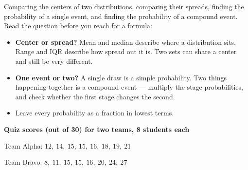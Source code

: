 \documentclass[12pt]{article}
\begin{document}

\noindent\small
Comparing the centers of two distributions, comparing their spreads, finding
the probability of a single event, and finding the probability of a compound
event. Read the question before you reach for a formula:
\begin{itemize}[leftmargin=1.1cm, itemsep=1pt, topsep=2pt]
  \item \textbf{Center or spread?} Mean and median describe where a
        distribution sits. Range and IQR describe how spread out it is. Two
        sets can share a center and still be very different.
  \item \textbf{One event or two?} A single draw is a simple probability. Two
        things happening together is a compound event --- multiply the stage
        probabilities, and check whether the first stage changes the second.
  \item Leave every probability as a fraction in lowest terms.
\end{itemize}
\normalsize

\vspace{0.15cm}

\noindent\textbf{Quiz scores (out of 30) for two teams, 8 students each}
\par\smallskip
\noindent\hspace*{0.4cm}Team Alpha: \quad $12,\ 14,\ 15,\ 15,\ 16,\ 18,\ 19,\ 21$
\par
\noindent\hspace*{0.4cm}Team Bravo: \quad $8,\ 11,\ 15,\ 15,\ 16,\ 20,\ 24,\ 27$

\begin{center}

\vspace{0.15cm}

\end{center}
\end{document}
